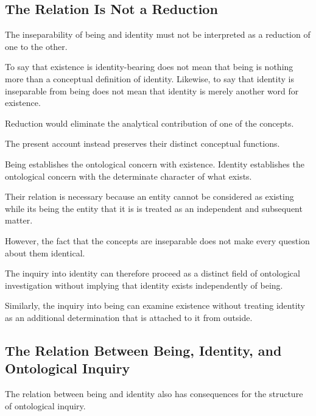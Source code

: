 \subsection{The Relation Is Not a Reduction}
\label{subsec:being-identity-not-reduction}

The inseparability of being and identity must
not be interpreted as a reduction of one to
the other.

To say that existence is identity-bearing does
not mean that being is nothing more than a
conceptual definition of identity. Likewise,
to say that identity is inseparable from being
does not mean that identity is merely another
word for existence.

Reduction would eliminate the analytical
contribution of one of the concepts.

The present account instead preserves their
distinct conceptual functions.

Being establishes the ontological concern with
existence. Identity establishes the ontological
concern with the determinate character of what
exists.

Their relation is necessary because an entity
cannot be considered as existing while its
being the entity that it is is treated as an
independent and subsequent matter.

However, the fact that the concepts are
inseparable does not make every question about
them identical.

The inquiry into identity can therefore proceed
as a distinct field of ontological investigation
without implying that identity exists independently
of being.

Similarly, the inquiry into being can examine
existence without treating identity as an
additional determination that is attached to
it from outside.



\subsection{The Relation Between Being, Identity, and Ontological Inquiry}
\label{subsec:being-identity-and-ontological-inquiry}

The relation between being and identity also
has consequences for the structure of ontological
inquiry.

